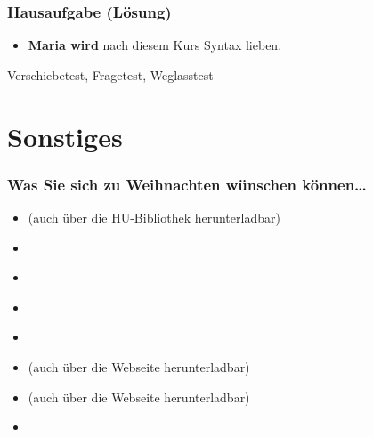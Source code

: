 {\begin{frame}
\end{frame}



\begin{frame}
\frametitle{Hausaufgabe (Lösung)}

\begin{itemize}
	\item[] \textbf{Maria wird} nach diesem Kurs Syntax lieben.
\end{itemize}

\pause 

\ea Verschiebetest, Fragetest, Weglasstest \ras {}
	\z 
\z

\end{frame}

} %


\section{Sonstiges}


\begin{frame}
\frametitle{Was Sie sich zu Weihnachten wünschen können\dots}

\begin{itemize}
	\item \citet{Glueck&Roedel16a} (auch über die HU-Bibliothek herunterladbar)
	\item \citet{Luedeling2009a}
	\item \citet{Brandt&Co06a}
	\item \citet{Grewendorf&Co91a}
	\item \citet{Chomsky65a}
	\item \citet{MuellerS15b} (auch über die Webseite herunterladbar)
	\item \citet{MuellerS13f} (auch über die Webseite herunterladbar)
	\item \citet{Pinker95a}

\end{itemize}

\end{frame}


